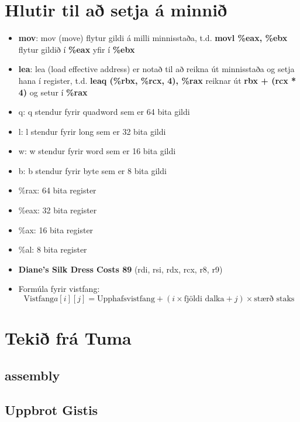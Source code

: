 \documentclass{article}
\begin{document}
\section {Hlutir til að setja á minnið}
\begin{itemize}
    \item \textbf{mov}: mov (move) flytur gildi á milli minnisstaða, t.d. \textbf{movl \%eax, \%ebx} flytur gildið í \textbf{\%eax} yfir í \textbf{\%ebx}
    \item \textbf{lea}: lea (load effective address) er notað til að reikna út minnisstaða og setja hana í register, t.d. \textbf{leaq (\%rbx, \%rcx, 4), \%rax} 
    reiknar út \textbf{rbx + (rcx * 4)} og setur í \textbf{\%rax}
    \item q: q stendur fyrir quadword sem er 64 bita gildi
    \item l: l stendur fyrir long sem er 32 bita gildi
    \item w: w stendur fyrir word sem er 16 bita gildi
    \item b: b stendur fyrir byte sem er 8 bita gildi
    \item \%rax: 64 bita register
    \item \%eax: 32 bita register
    \item \%ax: 16 bita register
    \item \%al: 8 bita register
    \item \textbf{Diane's Silk Dress Costs 89} (rdi, rsi, rdx, rcx, r8, r9)
    \item Formúla fyrir vistfang:
    \[\text{Vistfang} a[i][j] = \text{Upphafsvistfang} + ( i \times \text{fjöldi dalka} + j) \times \text{stærð staks}\]
\end{itemize}






\newpage

\section{Tekið frá Tuma}

\subsection{assembly}



\subsection{Uppbrot Gistis}
\end{document}
